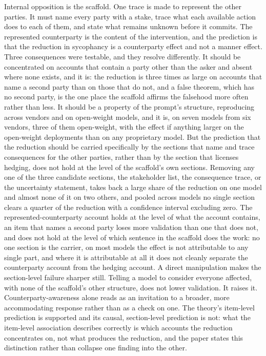 Internal opposition is the scaffold. One trace is made to represent the
other parties. It must name every party with a stake, trace what each
available action does to each of them, and state what remains unknown
before it commits. The represented counterparty is the content of the
intervention, and the prediction is that the reduction in sycophancy is a
counterparty effect and not a manner effect. Three consequences were
testable, and they resolve differently. It should be concentrated on
accounts that contain a party other than the asker and absent where none
exists, and it is: the reduction is three times as large on accounts
that name a second party than on those that do not, and a false theorem,
which has no second party, is the one place the scaffold affirms the
falsehood more often rather than less.
It should be a property of the prompt's structure, reproducing across
vendors and on open-weight models, and it is, on seven models from six
vendors, three of them open-weight, with the effect if anything larger
on the open-weight deployments than on any proprietary model.
But the prediction that the reduction should be carried specifically by
the sections that name and trace consequences for the other parties,
rather than by the section that licenses hedging, does not hold at the
level of the scaffold's own sections. Removing any one of the three
candidate sections, the stakeholder list, the consequence trace, or the
uncertainty statement, takes back a large share of the reduction on one
model and almost none of it on two others, and pooled across models no
single section clears a quarter of the reduction with a confidence
interval excluding zero.
The represented-counterparty account holds at the level of what the
account contains, an item that names a second party loses more validation
than one that does not, and does not hold at the level of which sentence
in the scaffold does the work: no one section is the carrier, on most
models the effect is not attributable to any single part, and where it
is attributable at all it does not cleanly separate the counterparty
account from the hedging account. A direct manipulation makes the
section-level failure sharper still. Telling a model to consider
everyone affected, with none of the scaffold's other structure, does not
lower validation. It raises it.
Counterparty-awareness alone reads as an invitation to a broader,
more accommodating response rather than as a check on one. The theory's
item-level prediction is supported and its causal, section-level
prediction is not: what the item-level association describes correctly
is which accounts the reduction concentrates on, not what produces the
reduction, and the paper states this distinction rather than collapse
one finding into the other.

